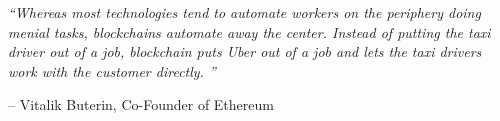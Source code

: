 
\vspace*{\fill}

{\Large\textit{``Whereas most technologies tend to automate workers on the periphery doing menial tasks, blockchains automate away the center. Instead of putting the taxi driver out of a job, blockchain puts Uber out of a job and lets the taxi drivers work with the customer directly.
''}}


\begin{flushright}
-- Vitalik Buterin, Co-Founder of Ethereum
\end{flushright}

\vspace*{\fill}
